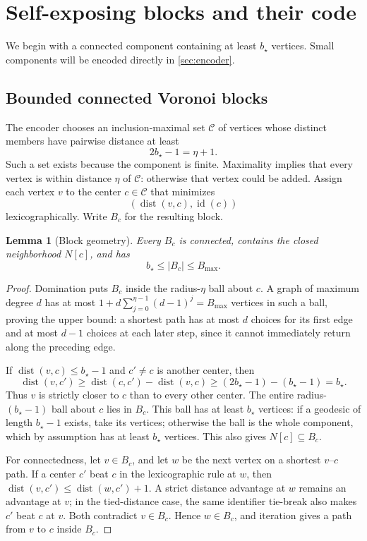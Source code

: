 \documentclass[11pt]{article}
\newtheorem{lemma}[theorem]{Lemma}
\theoremstyle{definition}
\theoremstyle{remark}
\newcommand{\id}{\operatorname{id}}
\newcommand{\dist}{\operatorname{dist}}
\begin{document}
\section{Self-exposing blocks and their code}
\label{sec:blocks}

We begin with a connected component containing at least $b_\star$ vertices.
Small components will be encoded directly in \cref{sec:encoder}.

\subsection{Bounded connected Voronoi blocks}

The encoder chooses an inclusion-maximal set $\mathcal C$ of vertices whose
distinct members have pairwise distance at least
\[
                            2b_\star-1=\eta+1.                 \tag{4.1}
\]
Such a set exists because the component is finite.  Maximality implies that
every vertex is within distance $\eta$ of $\mathcal C$: otherwise that vertex
could be added.  Assign each vertex $v$ to the center $c\in\mathcal C$ that
minimizes
\[
                            (\dist(v,c),\id(c))                 \tag{4.2}
\]
lexicographically.  Write $B_c$ for the resulting block.

\begin{lemma}[Block geometry]
\label{lem:block-geometry}
Every $B_c$ is connected, contains the closed neighborhood $N[c]$, and has
\[
                            b_\star\le |B_c|\le B_{\max}.       \tag{4.3}
\]
\end{lemma}

\begin{proof}
Domination puts $B_c$ inside the radius-$\eta$ ball about $c$.  A graph of
maximum degree $d$ has at most
$1+d\sum_{j=0}^{\eta-1}(d-1)^j=B_{\max}$ vertices in such a ball, proving the
upper bound: a shortest path has at most $d$ choices for its first edge
and at most $d-1$ choices at each later step, since it cannot immediately
return along the preceding edge.

If $\dist(v,c)\le b_\star-1$ and $c'\ne c$ is another center, then
\[
 \dist(v,c')\ge \dist(c,c')-\dist(v,c)
              \ge(2b_\star-1)-(b_\star-1)=b_\star.
\]
Thus $v$ is strictly closer to $c$ than to every other center.  The entire
radius-$(b_\star-1)$ ball about $c$ lies in $B_c$.  This ball has at least
$b_\star$ vertices: if a geodesic of length $b_\star-1$ exists, take its
vertices; otherwise the ball is the whole component, which by assumption
has at least $b_\star$ vertices.  This also gives $N[c]\subseteq B_c$.

For connectedness, let $v\in B_c$, and let $w$ be the next vertex on a
shortest $v$--$c$ path.  If a center $c'$ beat $c$ in the lexicographic rule
at $w$, then $\dist(v,c')\le\dist(w,c')+1$.  A strict distance advantage at
$w$ remains an advantage at $v$; in the tied-distance case, the same
identifier tie-break also makes $c'$ beat $c$ at $v$.  Both contradict
$v\in B_c$.  Hence $w\in B_c$, and iteration gives a path from $v$ to $c$
inside $B_c$.
\end{proof}
\end{document}
